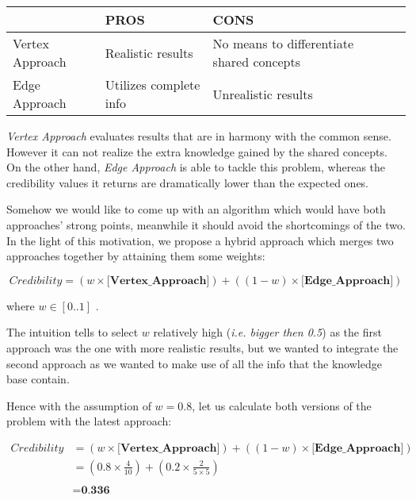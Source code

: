 \documentclass[egilmezThesis.tex]{subfiles}
\begin{document}
\begin{center}
    \begin{tabular}{ | l | l | l | l }
    \hline
     & PROS & CONS \\ \hline
    Vertex Approach & Realistic results  & No means to differentiate shared concepts  \\ \hline
    Edge Approach &  Utilizes complete info & Unrealistic results   \\ \hline

    
    \end{tabular}
\end{center}

\textit{Vertex Approach} evaluates results that are in harmony with the common sense. However it can not realize the extra knowledge gained by the shared concepts. On the other hand, \textit{Edge Approach} is able to tackle this problem, whereas the credibility values it returns are dramatically lower than the expected ones. 

Somehow we would like to come up with an algorithm which would have both approaches' strong points, meanwhile it should avoid the shortcomings of the two. In the light of this motivation, we propose a hybrid approach which merges two approaches together by attaining them some weights:

\begin{equation}
\textit{Credibility} = (w \times  \textbf{[Vertex\_Approach]}) + ((1-w) \times  \textbf{[Edge\_Approach]})
\end{equation}

where $w \in [0..1]$ .

The intuition tells to select $w$ relatively high (\textit{i.e. bigger then 0.5}) as the first approach was the one with more realistic results, but we wanted to integrate the second approach as we wanted to make use of all the info that the knowledge base contain.

Hence with the assumption of $w = 0.8$, let us calculate both versions of the problem with the latest approach:

 \begin{equation}
\begin{split}
\textit{Credibility} &= (w \times  \textbf{[Vertex\_Approach]}) + ((1-w) \times  \textbf{[Edge\_Approach]}) \\
&= (0.8 \times \frac{4}{10}) + (0.2 \times \frac{2}{5 \times 5}) \\ \\
&= \textbf{0.336} 
\end{split}
\end{equation}
\end{document}
